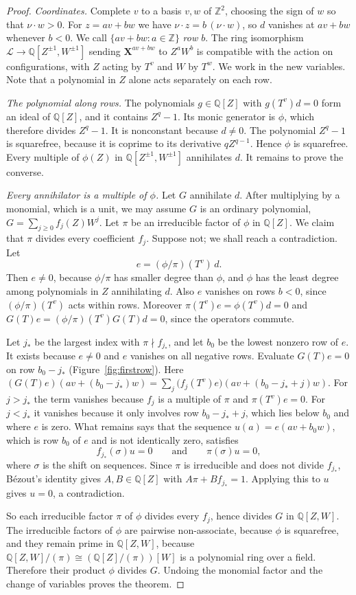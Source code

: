 \documentclass[11pt,a4paper,reqno]{amsart}
\theoremstyle{definition}
\theoremstyle{remark}
\newcommand{\Z}{\mathbb Z}
\newcommand{\Q}{\mathbb Q}
\newcommand{\LL}{\mathcal L}
\newcommand{\mon}[1]{\boldsymbol X^{#1}}
\numberwithin{equation}{section}
\begin{document}
\begin{proof}
\emph{Coordinates.} Complete $v$ to a basis $v,w$ of $\Z^2$, choosing the sign of $w$ so that $\nu\cdot w>0$. For $z=av+bw$ we have $\nu\cdot z=b\,(\nu\cdot w)$, so $d$ vanishes at $av+bw$ whenever $b<0$. We call $\{av+bw:a\in\Z\}$ \emph{row $b$}. The ring isomorphism $\LL\to\Q[Z^{\pm1},W^{\pm1}]$ sending $\mon{av+bw}$ to $Z^aW^b$ is compatible with the action on configurations, with $Z$ acting by $T^v$ and $W$ by $T^w$. We work in the new variables. Note that a polynomial in $Z$ alone acts separately on each row.

\emph{The polynomial along rows.} The polynomials $g\in\Q[Z]$ with $g(T^v)d=0$ form an ideal of $\Q[Z]$, and it contains $Z^q-1$. Its monic generator is $\phi$, which therefore divides $Z^q-1$. It is nonconstant because $d\ne0$. The polynomial $Z^q-1$ is squarefree, because it is coprime to its derivative $qZ^{q-1}$. Hence $\phi$ is squarefree. Every multiple of $\phi(Z)$ in $\Q[Z^{\pm1},W^{\pm1}]$ annihilates $d$. It remains to prove the converse.

\emph{Every annihilator is a multiple of $\phi$.} Let $G$ annihilate $d$. After multiplying by a monomial, which is a unit, we may assume $G$ is an ordinary polynomial, $G=\sum_{j\ge0}f_j(Z)W^j$. Let $\pi$ be an irreducible factor of $\phi$ in $\Q[Z]$. We claim that $\pi$ divides every coefficient $f_j$. Suppose not; we shall reach a contradiction. Let
\[
 e=(\phi/\pi)(T^v)\,d.
\]
Then $e\ne0$, because $\phi/\pi$ has smaller degree than $\phi$, and $\phi$ has the least degree among polynomials in $Z$ annihilating $d$. Also $e$ vanishes on rows $b<0$, since $(\phi/\pi)(T^v)$ acts within rows. Moreover $\pi(T^v)e=\phi(T^v)d=0$ and $G(T)e=(\phi/\pi)(T^v)G(T)d=0$, since the operators commute.

Let $j_*$ be the largest index with $\pi\nmid f_{j_*}$, and let $b_0$ be the lowest nonzero row of $e$. It exists because $e\ne0$ and $e$ vanishes on all negative rows. Evaluate $G(T)e=0$ on row $b_0-j_*$ (Figure~\ref{fig:firstrow}). Here $(G(T)e)(av+(b_0-j_*)w)=\sum_j\bigl(f_j(T^v)e\bigr)(av+(b_0-j_*+j)w)$. For $j>j_*$ the term vanishes because $f_j$ is a multiple of $\pi$ and $\pi(T^v)e=0$. For $j<j_*$ it vanishes because it only involves row $b_0-j_*+j$, which lies below $b_0$ and where $e$ is zero. What remains says that the sequence $u(a)=e(av+b_0w)$, which is row $b_0$ of $e$ and is not identically zero, satisfies
\[
 f_{j_*}(\sigma)u=0\qquad\text{and}\qquad \pi(\sigma)u=0,
\]
where $\sigma$ is the shift on sequences. Since $\pi$ is irreducible and does not divide $f_{j_*}$, Bézout's identity gives $A,B\in\Q[Z]$ with $A\pi+Bf_{j_*}=1$. Applying this to $u$ gives $u=0$, a contradiction.

So each irreducible factor $\pi$ of $\phi$ divides every $f_j$, hence divides $G$ in $\Q[Z,W]$. The irreducible factors of $\phi$ are pairwise non-associate, because $\phi$ is squarefree, and they remain prime in $\Q[Z,W]$, because $\Q[Z,W]/(\pi)\cong(\Q[Z]/(\pi))[W]$ is a polynomial ring over a field. Therefore their product $\phi$ divides $G$. Undoing the monomial factor and the change of variables proves the theorem.
\end{proof}
\end{document}

